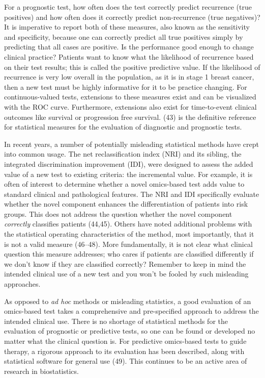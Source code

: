 \documentclass[11pt]{article}
\begin{document}
For a prognostic test, how often does the test correctly predict
recurrence (true positives) and how often does it correctly predict
non-recurrence (true negatives)? It is imperative to report both of
these measures, also known as the sensitivity and specificity, because
one can correctly predict all true positives simply by predicting that
all cases are positive. Is the performance good enough to change
clinical practice? Patients want to know what the likelihood of
recurrence based on their test results; this is called the positive
predictive value. If the likelihood of recurrence is very low overall in
the population, as it is in stage 1 breast cancer, then a new test must
be highly informative for it to be practice changing. For
continuous-valued tests, extensions to these measures exist and can be
visualized with the ROC curve. Furthermore, extensions also exist for
time-to-event clinical outcomes like survival or progression free
survival. (43) is the definitive reference for statistical measures for
the evaluation of diagnostic and prognostic tests.

In recent years, a number of potentially misleading statistical methods
have crept into common usage. The net reclassification index (NRI) and
its sibling, the integrated discrimination improvement (IDI), were
designed to assess the added value of a new test to existing criteria:
the incremental value. For example, it is often of interest to determine
whether a novel omics-based test adds value to standard clinical and
pathological features. The NRI and IDI specifically evaluate whether the
novel component enhances the differentiation of patients into risk
groups. This does not address the question whether the novel component
\emph{correctly} classifies patients (44,45). Others have noted
additional problems with the statistical operating characteristics of
the method, most importantly, that it is not a valid measure (46--48).
More fundamentally, it is not clear what clinical question this measure
addresses; who cares if patients are classified differently if we don't
know if they are classified correctly? Remember to keep in mind the
intended clinical use of a new test and you won't be fooled by such
misleading approaches.

As opposed to \emph{ad hoc} methods or misleading statistics, a good
evaluation of an omics-based test takes a comprehensive and
pre-specified approach to address the intended clinical use. There is no
shortage of statistical methods for the evaluation of prognostic or
predictive tests, so one can be found or developed no matter what the
clinical question is. For predictive omics-based tests to guide therapy,
a rigorous approach to its evaluation has been described, along with
statistical software for general use (49). This continues to be an
active area of research in biostatistics.
\end{document}
